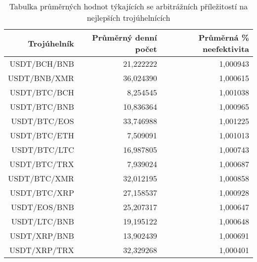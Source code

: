 \begin{table}\centering
\caption{Tabulka průměrných hodnot týkajících se arbitrážních příležitostí na nejlepších trojúhelnících}
\label{table_averages_best}
\begin{tabular}{|| r | r | r ||}\hline Trojúhelník & Průměrný denní počet & Průměrná \% neefektivita\\ [0.5ex]
 \hline\hline USDT/BCH/BNB & 21,222222 & 1,000943\\ 
 \hline USDT/BNB/XMR & 36,024390 & 1,000615\\ 
 \hline USDT/BTC/BCH & 8,254545 & 1,001038\\ 
 \hline USDT/BTC/BNB & 10,836364 & 1,000965\\ 
 \hline USDT/BTC/EOS & 33,746988 & 1,001225\\ 
 \hline USDT/BTC/ETH & 7,509091 & 1,001013\\ 
 \hline USDT/BTC/LTC & 16,987805 & 1,000743\\ 
 \hline USDT/BTC/TRX & 7,939024 & 1,000687\\ 
 \hline USDT/BTC/XMR & 32,012195 & 1,000858\\ 
 \hline USDT/BTC/XRP & 27,158537 & 1,000928\\ 
 \hline USDT/EOS/BNB & 25,207317 & 1,000647\\ 
 \hline USDT/LTC/BNB & 19,195122 & 1,000648\\ 
 \hline USDT/XRP/BNB & 13,902439 & 1,000691\\ 
 \hline USDT/XRP/TRX & 32,329268 & 1,000401\\ 
 \hline
\end{tabular}
\end{table}